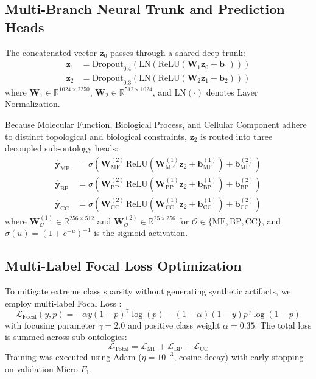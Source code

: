 \documentclass[journal]{IEEEtran}
\begin{document}
\subsection{Multi-Branch Neural Trunk and Prediction Heads}
The concatenated vector $\mathbf{z}_0$ passes through a shared deep trunk:
\begin{align}
\mathbf{z}_1 &= \text{Dropout}_{0.4}\left(\text{LN}\left(\text{ReLU}\left(\mathbf{W}_1 \mathbf{z}_0 + \mathbf{b}_1\right)\right)\right) \\
\mathbf{z}_2 &= \text{Dropout}_{0.3}\left(\text{LN}\left(\text{ReLU}\left(\mathbf{W}_2 \mathbf{z}_1 + \mathbf{b}_2\right)\right)\right)
\end{align}
where $\mathbf{W}_1 \in \mathbb{R}^{1024 \times 2250}$, $\mathbf{W}_2 \in \mathbb{R}^{512 \times 1024}$, and $\text{LN}(\cdot)$ denotes Layer Normalization.

Because Molecular Function, Biological Process, and Cellular Component adhere to distinct topological and biological constraints, $\mathbf{z}_2$ is routed into three decoupled sub-ontology heads:
\begin{align}
\hat{\mathbf{y}}_{\text{MF}} &= \sigma\left(\mathbf{W}_{\text{MF}}^{(2)} \, \text{ReLU}\left(\mathbf{W}_{\text{MF}}^{(1)} \mathbf{z}_2 + \mathbf{b}_{\text{MF}}^{(1)}\right) + \mathbf{b}_{\text{MF}}^{(2)}\right) \\
\hat{\mathbf{y}}_{\text{BP}} &= \sigma\left(\mathbf{W}_{\text{BP}}^{(2)} \, \text{ReLU}\left(\mathbf{W}_{\text{BP}}^{(1)} \mathbf{z}_2 + \mathbf{b}_{\text{BP}}^{(1)}\right) + \mathbf{b}_{\text{BP}}^{(2)}\right) \\
\hat{\mathbf{y}}_{\text{CC}} &= \sigma\left(\mathbf{W}_{\text{CC}}^{(2)} \, \text{ReLU}\left(\mathbf{W}_{\text{CC}}^{(1)} \mathbf{z}_2 + \mathbf{b}_{\text{CC}}^{(1)}\right) + \mathbf{b}_{\text{CC}}^{(2)}\right)
\end{align}
where $\mathbf{W}_{\mathcal{O}}^{(1)} \in \mathbb{R}^{256 \times 512}$ and $\mathbf{W}_{\mathcal{O}}^{(2)} \in \mathbb{R}^{25 \times 256}$ for $\mathcal{O} \in \{\text{MF}, \text{BP}, \text{CC}\}$, and $\sigma(u) = (1 + e^{-u})^{-1}$ is the sigmoid activation.

\subsection{Multi-Label Focal Loss Optimization}
To mitigate extreme class sparsity without generating synthetic artifacts, we employ multi-label Focal Loss \cite{lin2017focal}:
\begin{equation}
\mathcal{L}_{\text{Focal}}(y, p) = -\alpha y (1 - p)^\gamma \log(p) - (1 - \alpha) (1 - y) p^\gamma \log(1 - p)
\end{equation}
with focusing parameter $\gamma = 2.0$ and positive class weight $\alpha = 0.35$. The total loss is summed across sub-ontologies:
\begin{equation}
\mathcal{L}_{\text{Total}} = \mathcal{L}_{\text{MF}} + \mathcal{L}_{\text{BP}} + \mathcal{L}_{\text{CC}}
\end{equation}
Training was executed using Adam ($\eta = 10^{-3}$, cosine decay) with early stopping on validation Micro-$F_1$.
\end{document}
